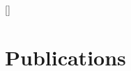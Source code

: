\documentclass[11pt,a4paper,sans]{moderncv}        %
\begin{document}




[\refname]{} %
\section{Publications}
\nocite{*}
%
%  
\printbibliography


\end{document}

